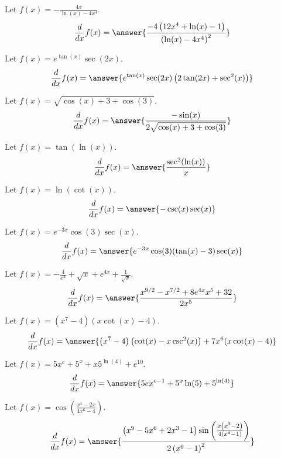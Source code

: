 \documentclass{ximera}
\begin{document}
\begin{shuffle}
\begin{exercise}
Let $f(x)=-\frac{4 x}{\ln (x)-4 x^4}$.
\[
\ddx f(x) = \answer{\frac{-4 \left(12 x^4+\ln (x)-1\right)}{\left(\ln (x)-4 x^4\right)^2}}
\]
\end{exercise}

\begin{exercise}
Let $f(x)=e^{\tan (x)} \sec (2 x)$.
\[
\ddx f(x) = \answer{e^{\tan (x)} \sec (2 x) \left(2 \tan (2 x)+\sec ^2(x)\right)}
\]
\end{exercise}

\begin{exercise}
Let $f(x)=\sqrt{\cos (x)+3+\cos (3)}$.
\[
\ddx f(x) = \answer{\frac{-\sin (x)}{2 \sqrt{\cos (x)+3+\cos (3)}}}
\]
\end{exercise}

\begin{exercise}
Let $f(x)=\tan (\ln (x))$.
\[
\ddx f(x) = \answer{\frac{\sec ^2(\ln (x))}{x}}
\]
\end{exercise}

\begin{exercise}
Let $f(x)=\ln (\cot (x))$.
\[
\ddx f(x) = \answer{-\csc (x) \sec (x)}
\]
\end{exercise}

\begin{exercise}
Let $f(x)=e^{-3 x} \cos (3) \sec (x)$.
\[
\ddx f(x) = \answer{e^{-3 x} \cos (3) (\tan (x)-3) \sec (x)}
\]
\end{exercise}

\begin{exercise}
Let $f(x)=-\frac{4}{x^4}+\sqrt{x}+e^{4 x}+\frac{1}{\sqrt{x}}$.
\[
\ddx f(x) = \answer{\frac{x^{9/2}-x^{7/2}+8 e^{4 x} x^5+32}{2 x^5}}
\]
\end{exercise}

\begin{exercise}
Let $f(x)=\left(x^7-4\right) (x \cot (x)-4)$.
\[
\ddx f(x) = \answer{\left(x^7-4\right) \left(\cot (x)-x \csc ^2(x)\right)+7 x^6 (x \cot (x)-4)}
\]
\end{exercise}

\begin{exercise}
Let $f(x)=5 x^e+5^x+x 5^{\ln (4)}+e^{10}$.
\[
\ddx f(x) = \answer{5 e x^{e-1}+5^x \ln (5)+5^{\ln (4)}}
\]
\end{exercise}

\begin{exercise}
Let $f(x)=\cos \left(\frac{x^4-2 x}{4 x^6-4}\right)$.
\[
\ddx f(x) = \answer{\frac{\left(x^9-5 x^6+2 x^3-1\right) \sin \left(\frac{x \left(x^3-2\right)}{4 \left(x^6-1\right)}\right)}{2 \left(x^6-1\right)^2}}
\]
\end{exercise}


\end{shuffle}
\end{document}
